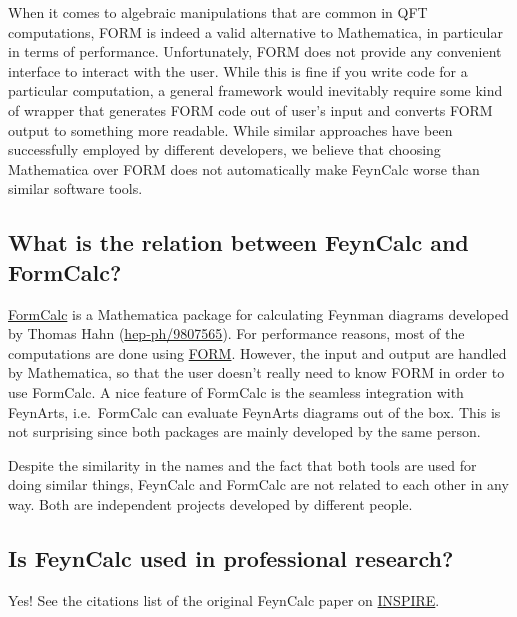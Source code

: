\documentclass[../FeynCalcManual.tex]{subfiles}
\begin{document}
When it comes to algebraic manipulations that are common in QFT
computations, FORM is indeed a valid alternative to Mathematica, in
particular in terms of performance. Unfortunately, FORM does not provide
any convenient interface to interact with the user. While this is fine
if you write code for a particular computation, a general framework
would inevitably require some kind of wrapper that generates FORM code
out of user's input and converts FORM output to something more readable.
While similar approaches have been successfully employed by different
developers, we believe that choosing Mathematica over FORM does not
automatically make FeynCalc worse than similar software tools.

\hypertarget{what-is-the-relation-between-feyncalc-and-formcalc}{%
\subsection{What is the relation between FeynCalc and
FormCalc?}\label{what-is-the-relation-between-feyncalc-and-formcalc}}

\href{http://www.feynarts.de/formcalc/}{FormCalc} is a Mathematica
package for calculating Feynman diagrams developed by Thomas Hahn
(\href{http://arxiv.org/abs/hep-ph/9807565}{hep-ph/9807565}). For
performance reasons, most of the computations are done using
\href{http://www.nikhef.nl/~form/}{FORM}. However, the input and output
are handled by Mathematica, so that the user doesn't really need to know
FORM in order to use FormCalc. A nice feature of FormCalc is the
seamless integration with FeynArts, i.e.~FormCalc can evaluate FeynArts
diagrams out of the box. This is not surprising since both packages are
mainly developed by the same person.

Despite the similarity in the names and the fact that both tools are
used for doing similar things, FeynCalc and FormCalc are not related to
each other in any way. Both are independent projects developed by
different people.

\hypertarget{is-feyncalc-used-in-professional-research}{%
\subsection{Is FeynCalc used in professional
research?}\label{is-feyncalc-used-in-professional-research}}

Yes! See the citations list of the original FeynCalc paper on
\href{http://inspirehep.net/record/28757/citations?ln=en}{INSPIRE}.
\end{document}
